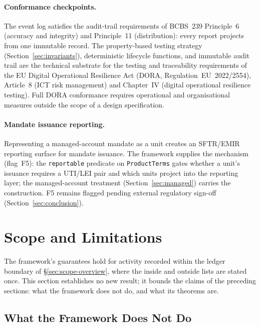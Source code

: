 \documentclass[11pt,a4paper]{article}
\begin{document}
\paragraph{Conformance checkpoints.}
The event log satisfies the audit-trail requirements of BCBS~239 Principle~6 (accuracy and integrity) and Principle~11 (distribution): every report projects from one immutable record. The property-based testing strategy (Section~\ref{sec:invariants}), deterministic lifecycle functions, and immutable audit trail are the technical substrate for the testing and traceability requirements of the EU Digital Operational Resilience Act (DORA, Regulation~EU~2022/2554), Article~8 (ICT risk management) and Chapter~IV (digital operational resilience testing). Full DORA conformance requires operational and organisational measures outside the scope of a design specification.

\paragraph{Mandate issuance reporting.}
Representing a managed-account mandate as a unit creates an SFTR/EMIR reporting surface for mandate issuance. The framework supplies the mechanism (flag~F5): the \texttt{reportable} predicate on \texttt{ProductTerms} gates whether a unit's issuance requires a UTI/LEI pair and which units project into the reporting layer; the managed-account treatment (Section~\ref{sec:managed}) carries the construction. F5 remains flagged pending external regulatory sign-off (Section~\ref{sec:conclusion}).

\clearpage

\section{Scope and Limitations}
\label{sec:scope-limitations}

The framework's guarantees hold for activity recorded within the ledger boundary of \S\ref{sec:scope-overview}, where the inside and outside lists are stated once. This section establishes no new result; it bounds the claims of the preceding sections: what the framework does not do, and what its theorems are.

\subsection{What the Framework Does Not Do}
\end{document}
